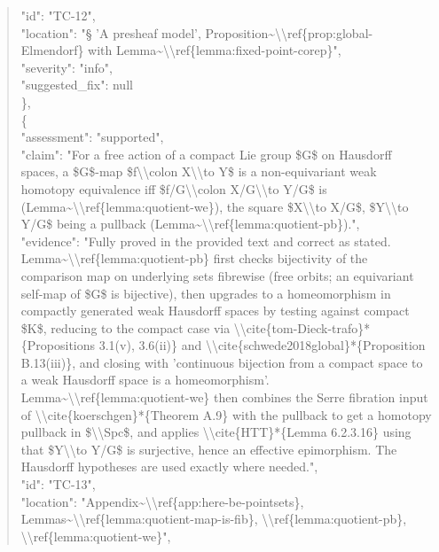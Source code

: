 \documentclass[11pt]{article}
\begin{document}
\begin{quote}
      "id": "TC-12",\\
      "location": "§ 'A presheaf model', Proposition\~{}\textbackslash{}\textbackslash{}ref\{prop:global-Elmendorf\} with Lemma\~{}\textbackslash{}\textbackslash{}ref\{lemma:fixed-point-corep\}",\\
      "severity": "info",\\
      "suggested\_fix": null\\
    \},\\
    \{\\
      "assessment": "supported",\\
      "claim": "For a free action of a compact Lie group \$G\$ on Hausdorff spaces, a \$G\$-map \$f\textbackslash{}\textbackslash{}colon X\textbackslash{}\textbackslash{}to Y\$ is a non-equivariant weak homotopy equivalence iff \$f/G\textbackslash{}\textbackslash{}colon X/G\textbackslash{}\textbackslash{}to Y/G\$ is (Lemma\~{}\textbackslash{}\textbackslash{}ref\{lemma:quotient-we\}), the square \$X\textbackslash{}\textbackslash{}to X/G\$, \$Y\textbackslash{}\textbackslash{}to Y/G\$ being a pullback (Lemma\~{}\textbackslash{}\textbackslash{}ref\{lemma:quotient-pb\}).",\\
      "evidence": "Fully proved in the provided text and correct as stated. Lemma\~{}\textbackslash{}\textbackslash{}ref\{lemma:quotient-pb\} first checks bijectivity of the comparison map on underlying sets fibrewise (free orbits; an equivariant self-map of \$G\$ is bijective), then upgrades to a homeomorphism in compactly generated weak Hausdorff spaces by testing against compact \$K\$, reducing to the compact case via \textbackslash{}\textbackslash{}cite\{tom-Dieck-trafo\}*\{Propositions 3.1(v), 3.6(ii)\} and \textbackslash{}\textbackslash{}cite\{schwede2018global\}*\{Proposition B.13(iii)\}, and closing with 'continuous bijection from a compact space to a weak Hausdorff space is a homeomorphism'. Lemma\~{}\textbackslash{}\textbackslash{}ref\{lemma:quotient-we\} then combines the Serre fibration input of \textbackslash{}\textbackslash{}cite\{koerschgen\}*\{Theorem A.9\} with the pullback to get a homotopy pullback in \$\textbackslash{}\textbackslash{}Spc\$, and applies \textbackslash{}\textbackslash{}cite\{HTT\}*\{Lemma 6.2.3.16\} using that \$Y\textbackslash{}\textbackslash{}to Y/G\$ is surjective, hence an effective epimorphism. The Hausdorff hypotheses are used exactly where needed.",\\
      "id": "TC-13",\\
      "location": "Appendix\~{}\textbackslash{}\textbackslash{}ref\{app:here-be-pointsets\}, Lemmas\~{}\textbackslash{}\textbackslash{}ref\{lemma:quotient-map-is-fib\}, \textbackslash{}\textbackslash{}ref\{lemma:quotient-pb\}, \textbackslash{}\textbackslash{}ref\{lemma:quotient-we\}",\\

\end{quote}
\end{document}
